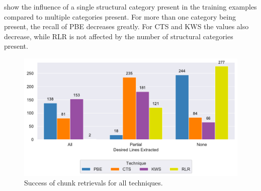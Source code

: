 show the influence of a single structural category present in the
training examples compared to multiple categories present.
For more
than one category being present, the recall of PBE decreases greatly.
For CTS and KWS the values also decrease, while RLR is not affected by
the number of structural categories present.

\begin{figure}[!t]
		\centering
		\includegraphics[width=\columnwidth,
		clip]{img/big-study/success-partial-all.pdf}
		\caption{Success of chunk retrievals for all techniques.}
		\label{fig:success-partial-all}
\end{figure}


